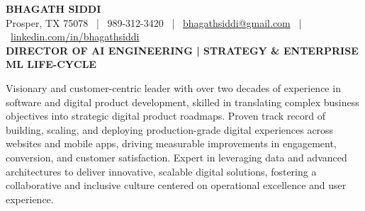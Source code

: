 \documentclass[9pt, letterpaper]{extarticle}
\begin{document}
\begin{center}
    {\huge \textbf{BHAGATH SIDDI}} \\
    \vspace{2pt}
    \small Prosper, TX 75078 \ | \ 989-312-3420 \ | \ \href{mailto:bhagathsiddi@gmail.com}{bhagathsiddi@gmail.com} \ | \ \href{https://www.linkedin.com/in/bhagathsiddi}{linkedin.com/in/bhagathsiddi} \\
    \vspace{4pt} 
    \textbf{\large DIRECTOR OF AI ENGINEERING | STRATEGY \& ENTERPRISE ML LIFE-CYCLE}
\end{center}

\vspace{-4pt}
{
\small \centering
Visionary and customer-centric leader with over two decades of experience in software and digital product development, skilled in translating complex business objectives into strategic digital product roadmaps. Proven track record of building, scaling, and deploying production-grade digital experiences across websites and mobile apps, driving measurable improvements in engagement, conversion, and customer satisfaction. Expert in leveraging data and advanced architectures to deliver innovative, scalable digital solutions, fostering a collaborative and inclusive culture centered on operational excellence and user experience.
\par}

\vspace{-4pt}

\end{document}
